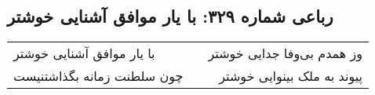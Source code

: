 \begin{center}
\section*{رباعی شماره ۳۲۹: با یار موافق آشنایی خوشتر}
\label{sec:sh329}
\begin{longtable}{l p{0.5cm} r}
با یار موافق آشنایی خوشتر
&&
وز همدم بی‌وفا جدایی خوشتر
\\
چون سلطنت زمانه بگذاشتنیست
&&
پیوند به ملک بینوایی خوشتر
\\
\end{longtable}
\end{center}
